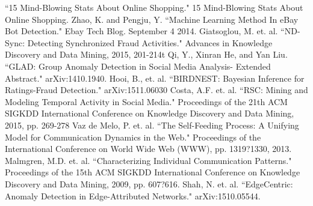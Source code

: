 \documentclass{article} %
\begin{document}
\begin{thebibliography}{123}

 ``15 Mind-Blowing Stats About Online Shopping." 15 Mind-Blowing Stats About Online Shopping.
 Zhao, K. and Pengju, Y. ``Machine Learning Method In eBay Bot Detection." Ebay Tech Blog. September 4 2014.
 Giatsoglou, M. et. al. ``ND-Sync: Detecting Synchronized Fraud Activities." Advances in Knowledge Discovery and Data Mining, 2015, 201-214t
 Qi, Y., Xinran He, and Yan Liu. ``GLAD: Group Anomaly Detection in Social Media Analysis- Extended Abstract." arXiv:1410.1940.
 Hooi, B., et. al. ``BIRDNEST: Bayesian Inference for Ratings-Fraud Detection." arXiv:1511.06030
 Costa, A.F. et. al. ``RSC: Mining and Modeling Temporal Activity in Social Media." Proceedings of the 21th ACM SIGKDD International Conference on Knowledge Discovery and Data Mining, 2015, pp. 269-278
 Vaz de Melo, P. et. al. ``The Self-Feeding Process: A Unifying Model for Communication Dynamics in the Web." Proceedings of the International Conference on World Wide Web (WWW), pp. 1319?1330, 2013.
 Malmgren, M.D. et. al. ``Characterizing Individual Communication Patterns." Proceedings of the 15th ACM SIGKDD International Conference on Knowledge Discovery and Data Mining, 2009, pp. 607?616.
 Shah, N. et. al. ``EdgeCentric: Anomaly Detection in Edge-Attributed Networks." arXiv:1510.05544.

\end{thebibliography}
\end{document}
